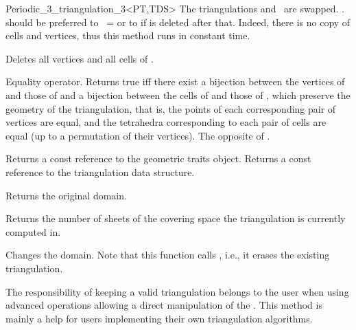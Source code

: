 \begin{ccRefClass}{Periodic_3_triangulation_3<PT,TDS>}
{The triangulations  and \ccVar\ are swapped.
\ccVar. should be preferred to \ccVar\ =  or to
 if  is deleted after that. Indeed, there is no
copy of cells and vertices, thus this method runs in constant time.}

{Deletes all vertices and all cells of \ccVar.}

{Equality operator.  Returns true iff there exist a bijection between the
vertices of  and those of  and a bijection between the cells of
 and those of , which preserve the geometry of the
triangulation, that is, the points of each corresponding pair of vertices are
equal, and the tetrahedra corresponding to each pair of cells are equal (up to
a permutation of their vertices).}
\ccGlue
{}
{The opposite of .}

\ccAccessFunctions


{Returns a const reference to the geometric traits object.}
\ccGlue
{}
{Returns a const reference to the triangulation data structure.}

{Returns the original domain.}

\begin{ccAdvanced}
{Returns the number of sheets of the covering space the triangulation is
  currently computed in.} 

{Changes the domain. Note that this function calls ,
  i.e., it erases the existing triangulation. }

The responsibility of keeping a valid triangulation belongs to the user
when using advanced operations allowing a direct manipulation of the .
This method is mainly a help for users implementing their own triangulation
algorithms.


\end{ccAdvanced}
\end{ccRefClass}

